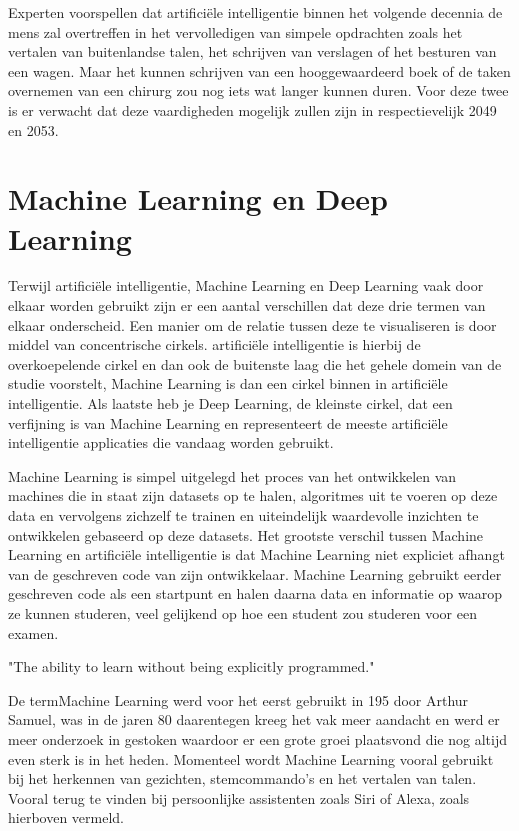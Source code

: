 Experten voorspellen dat artificiële intelligentie binnen het volgende decennia de mens zal overtreffen in het vervolledigen van simpele opdrachten zoals het vertalen van buitenlandse talen, het schrijven van verslagen of het besturen van een wagen. Maar het kunnen schrijven van een hooggewaardeerd boek of de taken overnemen van een chirurg zou nog iets wat langer kunnen duren. \autocite{Katja2018}
Voor deze twee is er verwacht dat deze vaardigheden mogelijk zullen zijn in respectievelijk 2049 en 2053.


\section{Machine Learning en Deep Learning}

Terwijl artificiële intelligentie, Machine Learning en Deep Learning vaak door elkaar worden gebruikt zijn er een aantal verschillen dat deze drie termen van elkaar onderscheid. Een manier om de relatie tussen deze te visualiseren is door middel van concentrische cirkels.
artificiële intelligentie is hierbij de overkoepelende cirkel en dan ook de buitenste laag die het gehele domein van de studie voorstelt, Machine Learning is dan een cirkel binnen in artificiële intelligentie. Als laatste heb je Deep Learning, de kleinste cirkel, dat een verfijning is van Machine Learning en representeert de meeste artificiële intelligentie applicaties die vandaag worden gebruikt.

Machine Learning is simpel uitgelegd het proces van het ontwikkelen van machines die in staat zijn datasets op te halen, algoritmes uit te voeren op deze data en vervolgens zichzelf te trainen en uiteindelijk waardevolle inzichten te ontwikkelen gebaseerd op deze datasets.
Het grootste verschil tussen Machine Learning en artificiële intelligentie is dat Machine Learning niet expliciet afhangt van de geschreven code van zijn ontwikkelaar. Machine Learning gebruikt eerder geschreven code als een startpunt en halen daarna data en informatie op waarop ze kunnen studeren, veel gelijkend op hoe een student zou studeren voor een examen.

\autocite{Arthur Samuel, 1959} "The ability to learn without being explicitly programmed."

De termMachine Learning werd voor het eerst gebruikt in 195 door Arthur Samuel,  was in de jaren 80 daarentegen kreeg het vak meer aandacht en werd er meer onderzoek in gestoken waardoor er een grote groei plaatsvond die nog altijd even sterk is in het heden. \autocite{KeithD.2019} 
Momenteel wordt Machine Learning vooral gebruikt bij het herkennen van gezichten, stemcommando's en het vertalen van talen. Vooral terug te vinden bij persoonlijke assistenten zoals Siri of Alexa, zoals hierboven vermeld.

